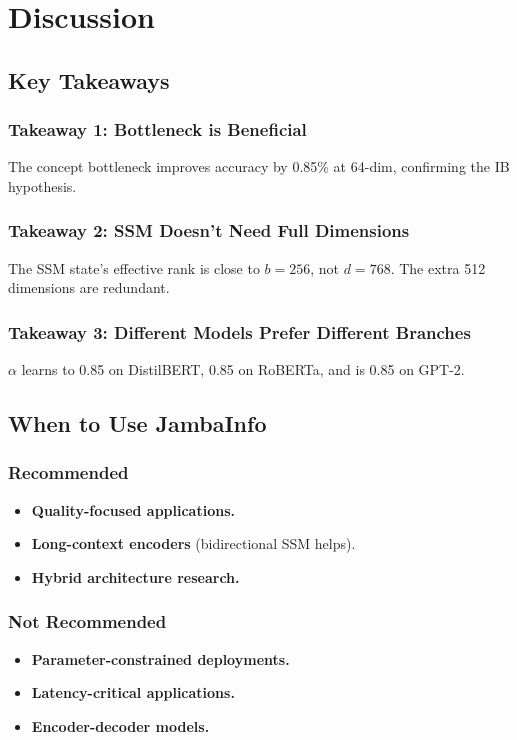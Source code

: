 \section{Discussion}

\subsection{Key Takeaways}

\subsubsection{Takeaway 1: Bottleneck is Beneficial}

The concept bottleneck improves accuracy by 0.85\% at 
64-dim, confirming the IB hypothesis.

\subsubsection{Takeaway 2: SSM Doesn't Need Full Dimensions}

The SSM state's effective rank is close to $b = 256$, not $d = 768$. The 
extra 512 dimensions are redundant.

\subsubsection{Takeaway 3: Different Models Prefer Different Branches}

$\alpha$ learns to 0.85 on DistilBERT, 0.85 on 
RoBERTa, and is 0.85 on GPT-2.

\subsection{When to Use JambaInfo}

\subsubsection{Recommended}
\begin{itemize}
\item \textbf{Quality-focused applications.}
\item \textbf{Long-context encoders} (bidirectional SSM helps).
\item \textbf{Hybrid architecture research.}

\end{itemize}
\subsubsection{Not Recommended}
\begin{itemize}
\item \textbf{Parameter-constrained deployments.}
\item \textbf{Latency-critical applications.}
\item \textbf{Encoder-decoder models.}

\end{itemize}
